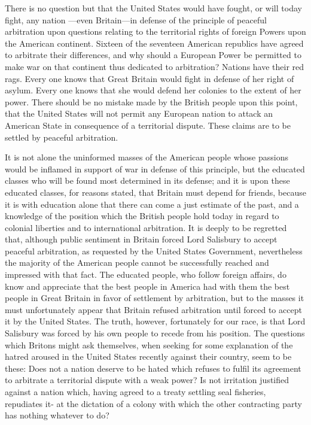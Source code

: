 \documentclass[11pt,openany]{book}
\begin{document}
There is no question but that the United States would have fought, or will today fight, any nation ---even Britain---in defense of the principle of peaceful arbitration upon questions relating to the territorial rights of foreign Powers upon the American continent. Sixteen of the seventeen American republics have agreed to arbitrate their differences, and why should a European Power be permitted to make war on that continent thus dedicated to arbitration? Nations have their red rags. Every one knows that Great Britain would fight in defense of her right of asylum. Every one knows that she would defend her colonies to the extent of her power. There should be no mistake made by the British people upon this point, that the United States will not permit any European nation to attack an American State in consequence of a territorial dispute. These claims are to be settled by peaceful arbitration.

It is not alone the uninformed masses of the American people whose passions would be inflamed in support of war in defense of this principle, but the educated classes who will be found most determined in its defense; and it is upon these educated classes, for reasons stated, that Britain must depend for friends, because it is with education alone that there can come a just estimate of the past, and a knowledge of the position which the British people hold today in regard to colonial liberties and to international arbitration. It is deeply to be regretted that, although public sentiment in Britain forced Lord Salisbury to accept peaceful arbitration, as requested by the United States Government, nevertheless the majority of the American people cannot be successfully reached and impressed with that fact. The educated people, who follow foreign affairs, do know and appreciate that the best people in America had with them the best people in Great Britain in favor of settlement by arbitration, but to the masses it must unfortunately appear that Britain refused arbitration until forced to accept it by the United States. The truth, however, fortunately for our race, is that Lord Salisbury was forced by his own people to recede from his position. The questions which Britons might ask themselves, when seeking for some explanation of the hatred aroused in the United States recently against their country, seem to be these: Does not a nation deserve to be hated which refuses to fulfil its agreement to arbitrate a territorial dispute with a weak power? Is not irritation justified against a nation which, having agreed to a treaty settling seal fisheries, repudiates it- at the dictation of a colony with which the other contracting party has nothing whatever to do?
\end{document}
